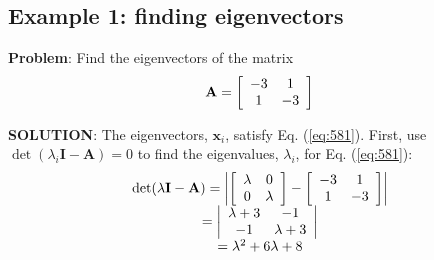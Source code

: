\subsection*{Example 1: finding eigenvectors} %
\label{ssub:example_1}

\textbf{Problem}: Find the eigenvectors of the matrix
\begin{equation}
	{\bf{A}} = \left[ {\begin{array}{*{20}c}
	   { - 3} & 1  \\
	   1 & { - 3}  \\
	\end{array}} \right]
\end{equation}

\textbf{SOLUTION}: The eigenvectors, $\mathbf{x}_i$, satisfy Eq. (\ref{eq:581}). First, use $\det(\lambda_i\mathbf{I}-\mathbf{A})=0$ to find the eigenvalues, $\lambda_i$, for Eq. (\ref{eq:581}):
\[
\begin{array}{c}
 \det (\lambda {\bf{I}} - {\bf{A}}) = \left| {\left[ {\begin{array}{*{20}c}
   \lambda  & 0  \\
   0 & \lambda   \\
\end{array}} \right] - \left[ {\begin{array}{*{20}c}
   { - 3} & 1  \\
   1 & { - 3}  \\
\end{array}} \right]} \right| \\ 
  = \left| {\begin{array}{*{20}c}
   {\lambda  + 3} & { - 1}  \\
   { - 1} & {\lambda  + 3}  \\
\end{array}} \right| \\ 
  = \lambda ^2  + 6\lambda  + 8 \\ 
 \end{array}
\]

